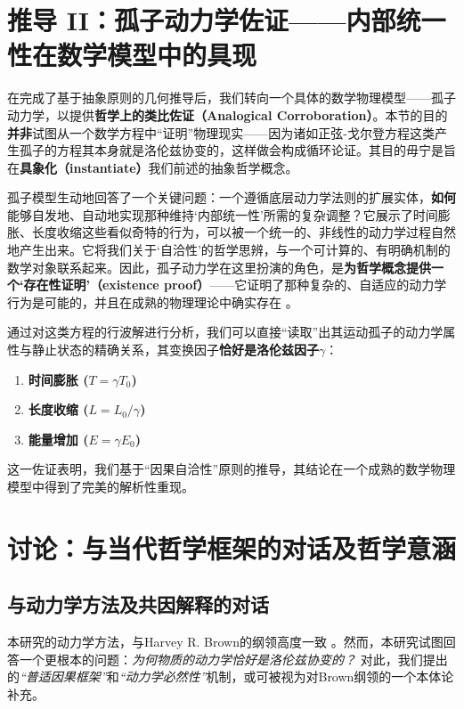 \documentclass[12pt, a4paper]{article}
\begin{document}
\section{推导 II：孤子动力学佐证——内部统一性在数学模型中的具现}

在完成了基于抽象原则的几何推导后，我们转向一个具体的数学物理模型——孤子动力学，以提供\textbf{哲学上的类比佐证（Analogical Corroboration）}。本节的目的\textbf{并非}试图从一个数学方程中``证明''物理现实——因为诸如正弦-戈尔登方程这类产生孤子的方程其本身就是洛伦兹协变的，这样做会构成循环论证。其目的毋宁是旨在\textbf{具象化（instantiate）}我们前述的抽象哲学概念。

孤子模型生动地回答了一个关键问题：一个遵循底层动力学法则的扩展实体，\textbf{如何}能够自发地、自动地实现那种维持‘内部统一性’所需的复杂调整？它展示了时间膨胀、长度收缩这些看似奇特的行为，可以被一个统一的、非线性的动力学过程自然地产生出来。它将我们关于‘自洽性’的哲学思辨，与一个可计算的、有明确机制的数学对象联系起来。因此，孤子动力学在这里扮演的角色，是\textbf{为哲学概念提供一个‘存在性证明’（existence proof）}——它证明了那种复杂的、自适应的动力学行为是可能的，并且在成熟的物理理论中确实存在 \cite{Skyrme1961, DrazinJohnson1989}。

通过对这类方程的行波解进行分析，我们可以直接``读取''出其运动孤子的动力学属性与静止状态的精确关系，其变换因子\textbf{恰好是洛伦兹因子$\gamma$}：
\begin{enumerate}
    \item \textbf{时间膨胀 ($T=\gamma T_0$)}
    \item \textbf{长度收缩 ($L=L_0/\gamma$)}
    \item \textbf{能量增加 ($E=\gamma E_0$)}
\end{enumerate}
这一佐证表明，我们基于``因果自洽性''原则的推导，其结论在一个成熟的数学物理模型中得到了完美的解析性重现。

\section{讨论：与当代哲学框架的对话及哲学意涵}

\subsection{与动力学方法及共因解释的对话}
本研究的动力学方法，与Harvey R. Brown的纲领高度一致 \cite{Brown2005}。然而，本研究试图回答一个更根本的问题：\textit{为何物质的动力学恰好是洛伦兹协变的？} 对此，我们提出的\textit{``普适因果框架''}和\textit{``动力学必然性''}机制，或可被视为对Brown纲领的一个本体论补充。
\end{document}
